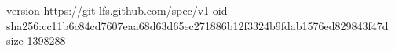 version https://git-lfs.github.com/spec/v1
oid sha256:cc11b6c84cd7607eaa68d63d65ec271886b12f3324b9fdab1576ed829843f47d
size 1398288
